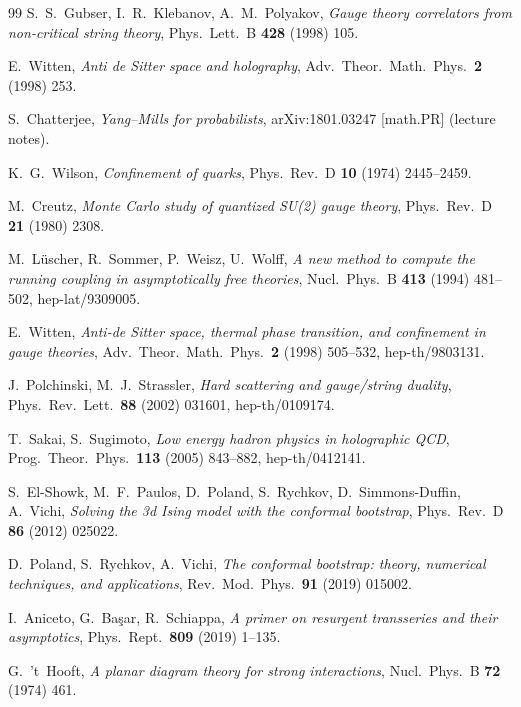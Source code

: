 {\begin{thebibliography}{99}
 S.~S.~Gubser, I.~R.~Klebanov, A.~M.~Polyakov, \emph{Gauge theory correlators from
  non-critical string theory}, Phys.\ Lett.\ B \textbf{428} (1998) 105.

 E.~Witten, \emph{Anti de Sitter space and holography},
  Adv.\ Theor.\ Math.\ Phys.\ \textbf{2} (1998) 253.

 S.~Chatterjee, \emph{Yang--Mills for probabilists}, arXiv:1801.03247
  [math.PR] (lecture notes).

 K.~G.~Wilson, \emph{Confinement of quarks}, Phys.\ Rev.\ D \textbf{10} (1974)
  2445--2459.

 M.~Creutz, \emph{Monte Carlo study of quantized SU(2) gauge theory}, Phys.\
  Rev.\ D \textbf{21} (1980) 2308.

 M.~L\"uscher, R.~Sommer, P.~Weisz, U.~Wolff, \emph{A new method to
  compute the running coupling in asymptotically free theories}, Nucl.\ Phys.\ B \textbf{413}
  (1994) 481--502, hep-lat/9309005.

 E.~Witten, \emph{Anti-de Sitter space, thermal phase transition, and
  confinement in gauge theories}, Adv.\ Theor.\ Math.\ Phys.\ \textbf{2} (1998) 505--532,
  hep-th/9803131.

 J.~Polchinski, M.~J.~Strassler, \emph{Hard scattering and
  gauge/string duality}, Phys.\ Rev.\ Lett.\ \textbf{88} (2002) 031601, hep-th/0109174.

 T.~Sakai, S.~Sugimoto, \emph{Low energy hadron physics in holographic
  QCD}, Prog.\ Theor.\ Phys.\ \textbf{113} (2005) 843--882, hep-th/0412141.

 S.~El-Showk, M.~F.~Paulos, D.~Poland, S.~Rychkov, D.~Simmons-Duffin,
  A.~Vichi, \emph{Solving the 3d Ising model with the conformal bootstrap}, Phys.\ Rev.\ D
  \textbf{86} (2012) 025022.

 D.~Poland, S.~Rychkov, A.~Vichi, \emph{The conformal bootstrap: theory, numerical
  techniques, and applications}, Rev.\ Mod.\ Phys.\ \textbf{91} (2019) 015002.

 I.~Aniceto, G.~Ba\c{s}ar, R.~Schiappa, \emph{A primer on resurgent transseries and
  their asymptotics}, Phys.\ Rept.\ \textbf{809} (2019) 1--135.

 G.~'t~Hooft, \emph{A planar diagram theory for strong interactions},
  Nucl.\ Phys.\ B \textbf{72} (1974) 461.

\end{thebibliography}
}
